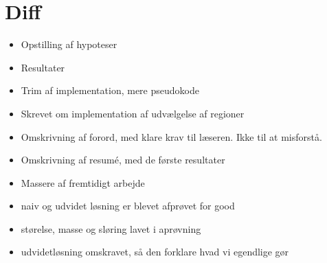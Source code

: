 {
\section*{Diff}
\begin{itemize}
    \item Opstilling af hypoteser
    \item Resultater
    \item Trim af implementation, mere pseudokode
    \item Skrevet om implementation af udvælgelse af regioner
    \item Omskrivning af forord, med klare krav til læseren. Ikke
        til at misforstå.
    \item Omskrivning af resumé, med de første resultater
    \item Massere af fremtidigt arbejde
	\item naiv og udvidet løsning er blevet afprøvet for good
	\item størelse, masse og sløring lavet i aprøvning
	\item udvidetløsning omskravet, så den forklare hvad vi egendlige gør
\end{itemize}
}

